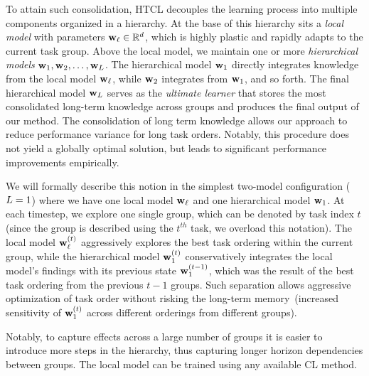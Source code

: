 To attain such consolidation, HTCL decouples the learning process into multiple components organized in a hierarchy. At the base of this hierarchy sits a \emph{local model} with parameters $\mathbf{w}_{\ell} \in \mathbb{R}^d$, which is highly plastic and rapidly adapts to the current task group. Above the local model, we maintain one or more \emph{hierarchical models} $\mathbf{w}_{1}, \mathbf{w}_{2}, \ldots, \mathbf{w}_{L}$. The hierarchical model $\mathbf{w}_{1}$ directly integrates knowledge from the local model $\mathbf{w}_{\ell}$, while $\mathbf{w}_{2}$ integrates from $\mathbf{w}_{1}$, and so forth. The final hierarchical model $\mathbf{w}_{L}$ serves as the \emph{ultimate learner} that stores the most consolidated long-term knowledge across groups and produces the final output of our method. The consolidation of long term knowledge allows our approach to reduce performance variance for long task orders. Notably, this procedure does not yield a globally optimal solution, but leads to significant performance improvements empirically.

We will formally describe this notion in the simplest two-model configuration ($L = 1$) where we have one local model $\mathbf{w}_{\ell}$ and one hierarchical model $\mathbf{w}_{1}$. At each timestep, we explore one single group, which can be denoted by task index $t$ (since the group is described using the $t^{th}$ task, we overload this notation). The local model $\mathbf{w}_{\ell}^{(t)}$ aggressively explores the best task ordering within the current group, while the hierarchical model $\mathbf{w}_{1}^{(t)}$ conservatively integrates the local model's findings with its previous state $\mathbf{w}_{1}^{(t-1)}$, which was the result of the best task ordering from the previous $t-1$ groups. Such separation allows aggressive optimization of task order without risking the long-term memory~(increased sensitivity of $\mathbf{w}_{1}^{(t)}$ across different orderings from different groups). 

Notably, to capture effects across a large number of groups it is easier to introduce more steps in the hierarchy, thus capturing longer horizon dependencies between groups. The local model can be trained using any available CL method. 

